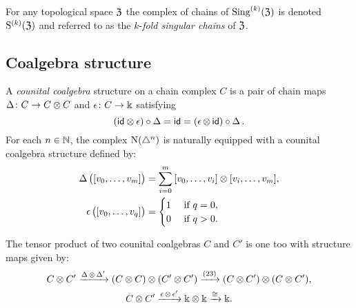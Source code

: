 
For any topological space $\mathfrak{Z}$ the complex of chains of $\operatorname{Sing}^{(k)}(\mathfrak{Z})$ is denoted $\mathrm{S}^{(k)}(\mathfrak{Z})$ and referred to as the $k$-\textit{fold singular chains} of $\mathfrak{Z}$.

\subsection{Coalgebra structure} \label{ss:coalgebra}

A \textit{counital coalgebra} structure on a chain complex $C$ is a pair of chain maps $\operatorname{\Delta} \colon C \to C \otimes C$ and $\operatorname{\epsilon} \colon C \to \Bbbk$ satisfying
\[
(\mathsf{id} \otimes \operatorname{\epsilon}) \circ \operatorname{\Delta} =
\mathsf{id} =
(\operatorname{\epsilon} \otimes\, \mathsf{id}) \circ \operatorname{\Delta}.
\]
For each $n \in \mathbb{N}$, the complex $\operatorname{N}(\triangle^n)$ is naturally equipped with a counital coalgebra structure defined by:
\[
\begin{split}
	\operatorname{\Delta} \big( [v_0, \dots, v_m] \big) &=
	\sum_{i=0}^m \, [v_0, \dots, v_i] \otimes [v_i, \dots, v_m], \\
	\operatorname{\epsilon} \big( [v_0, \dots, v_q] \big) &=
	\begin{cases} 1 & \text{ if } q = 0, \\ 0 & \text{ if } q>0. \end{cases}
\end{split}
\]

The tensor product of two counital coalgebras $C$ and $C'$ is one too with structure maps given by:
\begin{gather*}
	C \otimes C^\prime \xrightarrow{\operatorname{\Delta} \otimes \operatorname{\Delta}^\prime}
	(C \otimes C) \otimes (C^\prime \otimes C^\prime) \xrightarrow{(23)}
	(C \otimes C^\prime) \otimes (C \otimes C^\prime), \\
	C \otimes C^\prime \xrightarrow{\operatorname{\epsilon} \otimes \operatorname{\epsilon}^\prime}
	\Bbbk \otimes \Bbbk \xrightarrow{\cong} \Bbbk.
\end{gather*}

